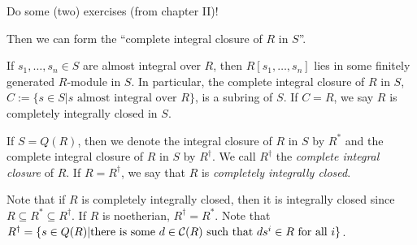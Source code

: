  \setcounter{lecture}{27}

 Do some (two) exercises (from chapter II)!

 Then we can form the ``complete integral closure of $R$ in $S$''.
 \begin{proposition}
   If $s_1,\dots, s_n\in S$ are almost integral over $R$, then $R[s_1,\dots, s_n]$ lies
   in some finitely generated $R$-module in $S$. In particular, the complete integral
   closure of $R$ in $S$, $C:=\{s\in S| s\text{ almost integral over }R\}$, is a subring
   of $S$. If $C=R$, we say $R$ is completely integrally closed in $S$.
 \end{proposition}
 \begin{definition}
   If $S=Q(R)$, then we denote the integral closure of $R$ in $S$ by $R^*$ and the
   complete integral closure of $R$ in $S$ by $R^\dag$. We call $R^\dag$ the
   \emph{complete integral closure} of $R$. If $R=R^\dag$, we say that $R$ is
   \emph{completely integrally closed}.
 \end{definition}
 \begin{remark}
   Note that if $R$ is completely integrally closed, then it is integrally closed since
   $R\subseteq R^*\subseteq R^\dag$. If $R$ is noetherian, $R^\dag=R^*$. Note that
   $R^\dag=\{s\in Q(R)|\text{there is some }d\in \mathcal{C}(R) \text{ such that }ds^i\in R\text{
   for all }i\}$.
 \end{remark}

